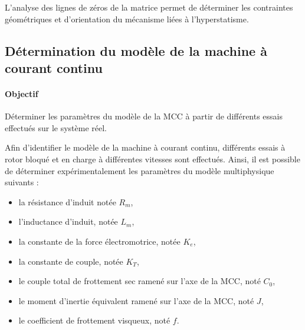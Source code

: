 

L'analyse des lignes de zéros de la matrice permet de déterminer les contraintes géométriques et d'orientation du mécanisme liées à l'hyperstatisme.


\subsection{Détermination du modèle de la machine à courant continu}

\paragraph{Objectif}

Déterminer les paramètres du modèle de la MCC à partir de différents essais effectués sur le système
réel.

Afin d'identifier le modèle de la machine à courant continu, différents essais à rotor bloqué et en charge à différentes vitesses sont effectués. Ainsi, il est possible de déterminer expérimentalement les paramètres du modèle multiphysique suivants :
\begin{itemize}
 \item la résistance d'induit notée $R_m$,
 \item l'inductance d'induit, notée $L_m$,
 \item la constante de la force électromotrice, notée $K_e$,
 \item la constante de couple, notée $K_T$,
 \item le couple total de frottement sec ramené sur l'axe de la MCC, noté $C_0$,
 \item le moment d'inertie équivalent ramené sur l'axe de la MCC, noté $J$,
 \item le coefficient de frottement visqueux, noté $f$.
\end{itemize}


